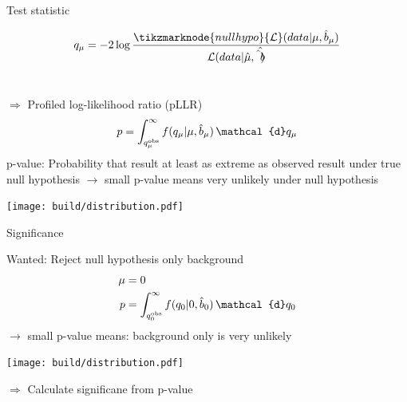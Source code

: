 \documentclass[aspectratio=1610, 9pt]{beamer}
\begin{document}
\begin{frame}{Test statistic}
    \begin{minipage}{0.49\textwidth}
        \Large
        \centering
        \begin{align}
            q_\mu = -2 \log{\frac{\tikzmarknode{nullhypo}{\mathcal{L}}(data\vert\mu,\hat{b}_\mu)}{\mathcal{L}(data\vert\hat{\mu},\hat{\hat{b})}}} \notag 
        \end{align}\\[3ex]
        $\Rightarrow$ Profiled log-likelihood ratio (pLLR)
        \begin{align}
            p = \int_{q_\mu^\text{obs}}^\infty f(q_\mu\vert \mu,\hat{b}_\mu)\,\mathcal{d}q_\mu \notag
        \end{align}
        p-value: Probability that result at least as extreme as observed result under true null hypothesis $\rightarrow$ small p-value means very unlikely under null hypothesis
    \end{minipage}
    \hfill
    \begin{minipage}{0.5\textwidth}
        \texttt{[image: build/distribution.pdf]}
    \end{minipage}
\end{frame}

\begin{frame}{Significance}
    \begin{minipage}{0.49\textwidth}
        \Large
        Wanted: Reject null hypothesis only background
        \centering
        \begin{align}
            \mu &= 0 \notag \\
            p &= \int_{q_0^\text{obs}}^\infty f(q_0\vert 0,\hat{b}_0)\,\mathcal{d}q_0 \notag
        \end{align}
    $\rightarrow$ small p-value means: background only is very unlikely
    \end{minipage}
    \hfill
    \begin{minipage}{0.5\textwidth}
        \texttt{[image: build/distribution.pdf]}
    \end{minipage}
    \centering
    \Large
    $\Rightarrow$ Calculate significane from p-value
\end{frame}
\end{document}
